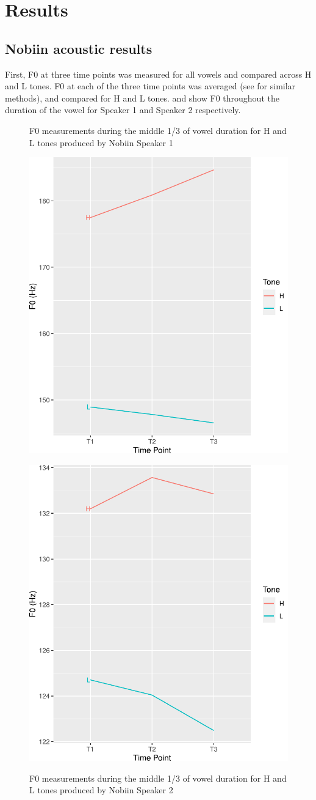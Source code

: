 \documentclass[output=paper]{langscibook}
\begin{document}
\section{Results}\label{sec:oakley:Results}\label{sec:oakley:3}
\subsection{Nobiin acoustic results}
First, F0 at three time points was measured for all vowels and compared across H and L tones. F0 at each of the three time points was averaged (see \cite{svantesson2006} for similar methods), and compared for H and L tones.  and  show F0 throughout the duration of the vowel for Speaker 1 and Speaker 2 respectively. 

\begin{figure}
 \begin{floatrow}
  \captionsetup{margin=.05\linewidth}
   \ffigbox
     {\caption{F0 measurements during the middle 1/3 of vowel duration for H and L tones produced by Nobiin Speaker 1}\label{fig:oakley:TanutPitchTones}}
     {\includegraphics[width=.5\textwidth]{figures/TanutF0Movement.pdf}}%
   \ffigbox
     {\caption{F0 measurements during the middle 1/3 of vowel duration for H and L tones produced by Nobiin Speaker 2\label{fig:oakley:TonePitchNuban}}}
     {\includegraphics[width=.5\textwidth]{figures/NubanF0Movement.pdf}}
 \end{floatrow}
\end{figure}
\end{document}
